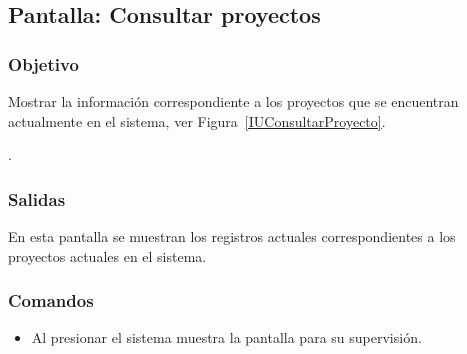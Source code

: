 \subsection{Pantalla: Consultar proyectos}

\subsubsection{Objetivo}
  Mostrar la información correspondiente a los proyectos que se encuentran actualmente en el sistema, ver Figura~\ref{IUConsultarProyecto}.

.

\subsubsection{Salidas}
  En esta pantalla se muestran los registros actuales correspondientes a los proyectos actuales en el sistema.

\subsubsection{Comandos}
\begin{itemize}
 \item Al presionar  el sistema muestra la pantalla  para su supervisión.
\end{itemize}

